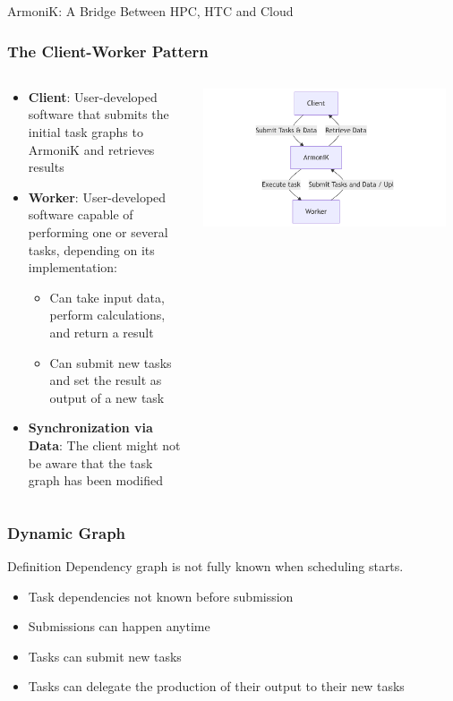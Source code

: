 \documentclass[10pt,aspectratio=1609]{beamer}
\begin{document}
\begin{section}{ArmoniK: A Bridge Between HPC, HTC and Cloud}
  \begin{frame}
    \frametitle{The Client-Worker Pattern}
    \begin{columns}[T]
      \begin{column}{0.5\textwidth}
        \begin{itemize}
          \item \textbf{Client}: User-developed software that submits the initial task graphs to ArmoniK and retrieves results
          \item \textbf{Worker}: User-developed software capable of performing one or several tasks, depending on its implementation:
          \begin{itemize}
            \item Can take input data, perform calculations, and return a result
            \item Can submit new tasks and set the result as output of a new task
          \end{itemize}
          \item \textbf{Synchronization via Data}: The client might not be aware that the task graph has been modified
        \end{itemize}
      \end{column}
      \begin{column}{0.5\textwidth}
        \centering
        \includegraphics[width=0.95\textwidth]{mermaid-client-worker.png}
      \end{column}
    \end{columns}
  \end{frame}

  \begin{frame}
    \frametitle{Dynamic Graph}
    \begin{block}{Definition}
      Dependency graph is not fully known when scheduling starts.
    \end{block}
    \begin{itemize}
      \item Task dependencies not known before submission
      \item Submissions can happen anytime
      \item Tasks can submit new tasks
      \item Tasks can delegate the production of their output to their new tasks
    \end{itemize}
  \end{frame}


\end{section}
\end{document}
